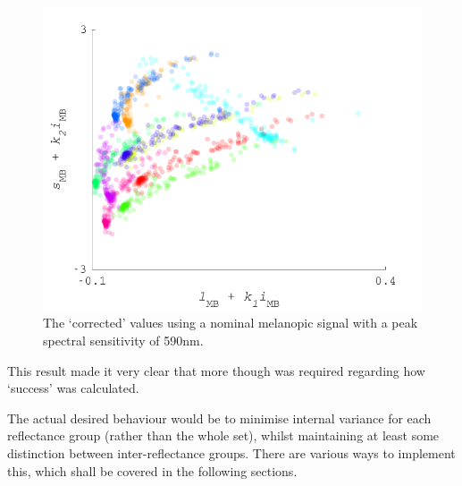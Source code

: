 \begin{figure}[htbp]
    \includegraphics[max width=\textwidth]{figs/comp/transformToIllIndSpace/correctedChromaticities_range590.pdf}
    \caption{The `corrected' values using a nominal melanopic signal with a peak spectral sensitivity of 590nm.}
    \label{fig:590}
\end{figure} 

This result made it very clear that more though was required regarding how `success' was calculated.

The actual desired behaviour would be to minimise internal variance for each reflectance group (rather than the whole set), whilst maintaining at least some distinction between inter-reflectance groups. There are various ways to implement this, which shall be covered in the following sections. %

